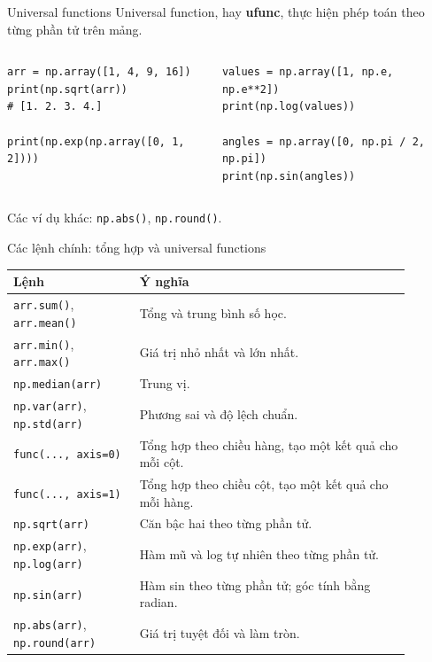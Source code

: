 \documentclass[aspectratio=169,11pt]{beamer}
\newcommand{\key}[1]{\textbf{\textcolor{AccentGreen}{#1}}}
\begin{document}
\begin{frame}[fragile]{Universal functions}
\small
Universal function, hay \key{ufunc}, thực hiện phép toán theo từng phần tử trên mảng.
\begin{columns}[T]
\begin{lstlisting}[style=py]
arr = np.array([1, 4, 9, 16])
print(np.sqrt(arr))
# [1. 2. 3. 4.]

print(np.exp(np.array([0, 1, 2])))
\end{lstlisting}
\begin{lstlisting}[style=py]
values = np.array([1, np.e, np.e**2])
print(np.log(values))

angles = np.array([0, np.pi / 2, np.pi])
print(np.sin(angles))
\end{lstlisting}
\end{columns}
\vspace{0.4em}
Các ví dụ khác: \texttt{np.abs()}, \texttt{np.round()}.
\end{frame}

\begin{frame}{Các lệnh chính: tổng hợp và universal functions}
\scriptsize
\begin{tabular}{p{0.29\linewidth}p{0.60\linewidth}}
\toprule
\textbf{Lệnh} & \textbf{Ý nghĩa} \\
\midrule
\texttt{arr.sum()}, \texttt{arr.mean()} & Tổng và trung bình số học. \\
\texttt{arr.min()}, \texttt{arr.max()} & Giá trị nhỏ nhất và lớn nhất. \\
\texttt{np.median(arr)} & Trung vị. \\
\texttt{np.var(arr)}, \texttt{np.std(arr)} & Phương sai và độ lệch chuẩn. \\
\texttt{func(..., axis=0)} & Tổng hợp theo chiều hàng, tạo một kết quả cho mỗi cột. \\
\texttt{func(..., axis=1)} & Tổng hợp theo chiều cột, tạo một kết quả cho mỗi hàng. \\
\texttt{np.sqrt(arr)} & Căn bậc hai theo từng phần tử. \\
\texttt{np.exp(arr)}, \texttt{np.log(arr)} & Hàm mũ và log tự nhiên theo từng phần tử. \\
\texttt{np.sin(arr)} & Hàm sin theo từng phần tử; góc tính bằng radian. \\
\texttt{np.abs(arr)}, \texttt{np.round(arr)} & Giá trị tuyệt đối và làm tròn. \\
\bottomrule
\end{tabular}
\end{frame}
\end{document}
